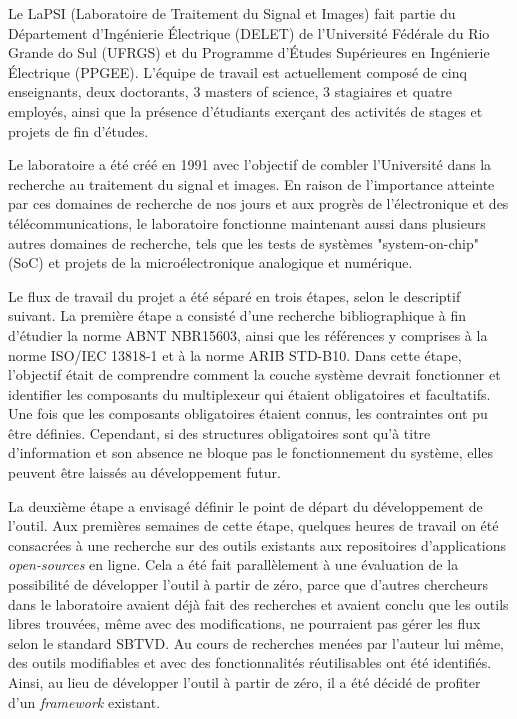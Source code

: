 \documentclass[12pt,a4paper]{article}
\begin{document}
Le LaPSI (Laboratoire de Traitement du Signal et Images) fait partie du Département d'Ingénierie Électrique (DELET) de l'Université Fédérale du Rio Grande do Sul (UFRGS) et du Programme d'Études Supérieures en Ingénierie Électrique (PPGEE). L'équipe de travail est actuellement composé de cinq enseignants, deux doctorants, 3 masters of science, 3 stagiaires et quatre employés, ainsi que la présence d'étudiants exerçant des activités de stages et projets de fin d'études.

Le laboratoire a été créé en 1991 avec l'objectif de combler l'Université dans la recherche au traitement du signal et images. En raison de l'importance atteinte par ces domaines de recherche de nos jours et aux progrès de l'électronique et des télécommunications, le laboratoire fonctionne maintenant aussi dans plusieurs autres domaines de recherche, tels que les tests de systèmes "system-on-chip" (SoC) et projets de la microélectronique analogique et numérique.

Le flux de travail du projet a été séparé en trois étapes, selon le descriptif suivant. La première étape a consisté d'une recherche bibliographique à fin d'étudier la norme ABNT NBR15603, ainsi que les références y comprises à la norme ISO/IEC 13818-1 et à la norme ARIB STD-B10. Dans cette étape, l'objectif était de comprendre comment la couche système devrait fonctionner et identifier les composants du multiplexeur qui étaient obligatoires et facultatifs. Une fois que les composants obligatoires étaient connus, les contraintes ont pu être définies. Cependant, si des structures obligatoires sont qu'à titre d'information et son absence ne bloque pas le fonctionnement du système, elles peuvent être laissés au développement futur.

La deuxième étape a envisagé définir le point de départ du développement de l'outil. Aux premières semaines de cette étape, quelques heures de travail on été consacrées à une recherche sur des outils existants aux repositoires d'applications \textit{open-sources} en ligne. Cela a été fait parallèlement à une évaluation de la possibilité de développer l'outil à partir de zéro, parce que d'autres chercheurs dans le laboratoire avaient déjà fait des recherches et avaient conclu que les outils libres trouvées, même avec des modifications, ne pourraient pas gérer les flux selon le standard SBTVD. Au cours de recherches menées par l'auteur lui même, des outils modifiables et avec des fonctionnalités réutilisables ont été identifiés. Ainsi, au lieu de développer l'outil à partir de zéro, il a été décidé de profiter d'un \textit{framework} existant.
\end{document}
